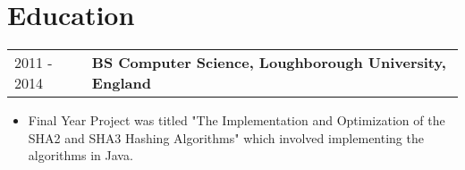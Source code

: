 \documentclass[11pt, letterpaper]{article}
\begin{document}
\section*{\selectfont Education}
\vspace{-0.2cm}
\begin{tabular}{p{0.76in}|p{6.24in}}
    2011 - 2014 & \textbf{BS Computer Science, Loughborough University, England}
\end{tabular}
\begin{itemize}[itemsep=0cm, parsep=0.2cm]
    \item Final Year Project was titled "The Implementation and Optimization of the SHA2 and SHA3 Hashing Algorithms" which involved implementing the algorithms in Java.
\end{itemize}
\end{document}

